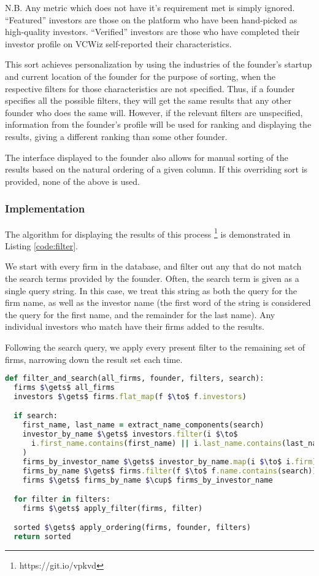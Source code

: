 N.B. Any metric which does not have it's requirement met is simply ignored. ``Featured'' investors are those on the platform who have been hand-picked as high-quality investors. ``Verified'' investors are those who have completed their investor profile on VCWiz self-reported their characteristics.

This sort achieves personalization by using the industries of the founder's startup and current location of the founder for the purpose of sorting, when the respective filters for those characteristics are not specified. Thus, if a founder specifies all the possible filters, they will get the same results that any other founder who does the same will. However, if the relevant filters are unspecified, information from the founder's profile will be used for ranking and displaying the results, giving a different ranking than some other founder.

The interface displayed to the founder also allows for manual sorting of the results based on the natural ordering of a given column. If this overriding sort is provided, none of the above is used.

\subsubsection{Implementation}

The algorithm for displaying the results of this process \footnote{https://git.io/vpkvd} is demonstrated in Listing \ref{code:filter}.

We start with every firm in the database, and filter out any that do not match the search terms provided by the founder. Often, the search term is given as a single query string. In this case, we treat this string as both the query for the firm name, as well as the investor name (the first word of the string is considered the query for the first name, and the remainder for the last name). Any individual investors who match have their firms added to the results.

Following the search query, we apply every present filter to the remaining set of firms, narrowing down the result set each time.

\begin{lstlisting}[float,frame=single,mathescape=true,language=Ruby,basicstyle=\footnotesize,columns=fullflexible,caption={Filter and Search},label={code:filter}]
def filter_and_search(all_firms, founder, filters, search):
  firms $\gets$ all_firms
  investors $\gets$ firms.flat_map(f $\to$ f.investors)

  if search:
    first_name, last_name = extract_name_components(search)
    investor_by_name $\gets$ investors.filter(i $\to$
      i.first_name.contains(first_name) || i.last_name.contains(last_name)
    )
    firms_by_investor_name $\gets$ investor_by_name.map(i $\to$ i.firm)
    firms_by_name $\gets$ firms.filter(f $\to$ f.name.contains(search))
    firms $\gets$ firms_by_name $\cup$ firms_by_investor_name

  for filter in filters:
    firms $\gets$ apply_filter(firms, filter)

  sorted $\gets$ apply_ordering(firms, founder, filters)
  return sorted
\end{lstlisting}


